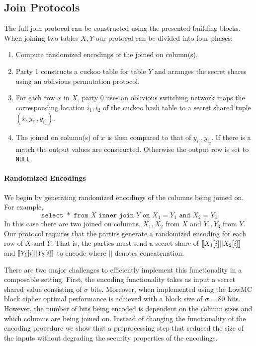 \subsection{Join Protocols}

The full join protocol can be constructed using the presented building blocks. When joining two tables $X,Y$ our protocol can be divided into four phases:

\begin{enumerate}
	\item Compute randomized encodings of the joined on column(s). 
	\item Party 1 constructs a cuckoo table for table $Y$ and arranges the secret shares using an oblivious permutation protocol. 
	\item For each row $x$ in $X$, party 0 uses an oblivious switching network maps the corresponding location $i_1,i_2$ of the cuckoo hash table to a secret shared tuple $(x, y_{i_1}, y_{i_2})$.
	\item The joined on column(s) of $x$ is then compared to that of $y_{i_1}, y_{i_2}$. If there is a match the output values are constructed. Otherwise the output row is set to \texttt{NULL}.
\end{enumerate} 

\paragraph{Randomized Encodings}
We begin by generating randomized encodings of the columns being joined on. For example, 
$$
	\texttt{select }* \texttt{ from } X \texttt{ inner join } Y \texttt{ on } X_1 = Y_1 \texttt{ and } X_2 = Y_3
$$
In this case there are two joined on columns, $X_1,X_2$ from $X$ and $Y_1,Y_3$ from $Y$. Our protocol requires that the parties generate a randomized encoding for each row of $X$ and $Y$. That is, the parties must send a secret share of $\llbracket X_1[i] || X_2[i]\rrbracket$ and $\llbracket Y_1[i] || Y_3[i]\rrbracket$ to \f{encode} where $||$ denotes concatenation. 

There are two major challenges to efficiently implement this functionality in a composable setting. First, the encoding functionality takes as input a secret shared value consisting of $\sigma$ bits. Moreover, when implemented using the LowMC block cipher optimal performance is achieved with a block size of $\sigma=80$ bits. However, the number of bits being encoded is dependent on the column sizes and which columns are being joined on. Instead of changing the functionality of the encoding procedure we show that a preprocessing step that reduced the size of the inputs without degrading the security properties of the encodings. 

